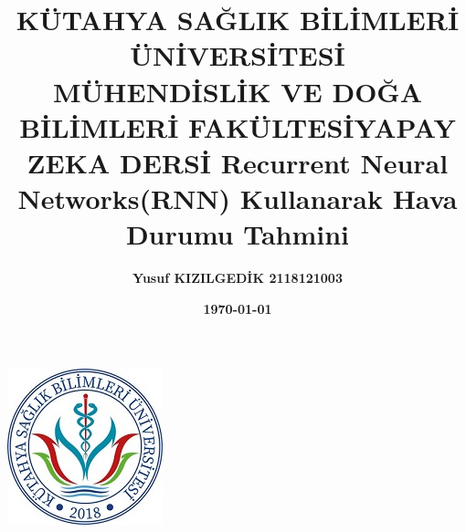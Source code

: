 \documentclass[12pt,a4paper]{article}
\title{\bf\fontsize{12pt}{14pt}\selectfont KÜTAHYA SAĞLIK BİLİMLERİ ÜNİVERSİTESİ \\ MÜHENDİSLİK VE DOĞA BİLİMLERİ FAKÜLTESİ}
\date{}
\begin{document}
	
	\maketitle
	\begin{center}
			\includegraphics[width=0.25\linewidth]{ksbu.png}
	\end{center}
             
	        
	\begin{center}
		\vspace{1cm} 
	\end{center}
	\begin{center}
	\title{\bf\fontsize{12pt}{14pt}\selectfont YAPAY ZEKA DERSİ }
	\end{center}
		\begin{center}
		\title{\bf\fontsize{12pt}{14pt}\selectfont Recurrent Neural Networks(RNN) Kullanarak Hava Durumu Tahmini}
	\end{center}
	\begin{center}
	\vspace{1cm} %
	\end{center}
	\begin{center}
		
	
	\author{\bf\fontsize{12pt}{14pt}Yusuf KIZILGEDİK \hspace{1.5cm}2118121003}
	
	\begin{center}
	\vspace{1cm} 
	\end{center}
	\date{\textbf{\today}}
	\end{center}
  \newpage
\end{document}
